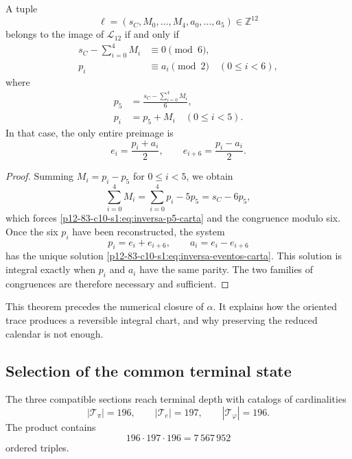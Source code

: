 \begin{theorem}
\label{p12-83-c10-s1:thm:inversion-carta-integral-156}
A tuple
\[
 \ell=(s_C,M_0,\ldots,M_4,a_0,\ldots,a_5)\in\mathbb Z^{12}
\]
belongs to the image of \(\mathcal L_{12}\) if and only if
\begin{align}
 s_C-\sum_{i=0}^{4}M_i&\equiv0\pmod6,
 \label{p12-83-c10-s1:eq:congruencia-seis-carta}\\
 p_i&\equiv a_i\pmod2
 \quad(0\leq i<6),
 \label{p12-83-c10-s1:eq:congruencia-paridad-carta}
\end{align}
where
\begin{align}
 p_5&=\frac{s_C-\sum_{i=0}^{4}M_i}{6},
 \label{p12-83-c10-s1:eq:inversa-p5-carta}\\
 p_i&=p_5+M_i\quad(0\leq i<5).
 \label{p12-83-c10-s1:eq:inversa-pi-carta}
\end{align}
In that case, the only entire preimage is
\begin{equation}
 e_i=\frac{p_i+a_i}{2},
 \qquad
 e_{i+6}=\frac{p_i-a_i}{2}.
 \label{p12-83-c10-s1:eq:inversa-eventos-carta}
\end{equation}
\end{theorem}

\begin{proof}
Summing \(M_i=p_i-p_5\) for \(0\leq i<5\), we obtain
\[
 \sum_{i=0}^{4}M_i
 =\sum_{i=0}^{4}p_i-5p_5
 =s_C-6p_5,
\]
which forces \eqref{p12-83-c10-s1:eq:inversa-p5-carta} and the congruence modulo six.
Once the six \(p_i\) have been reconstructed, the system
\[
 p_i=e_i+e_{i+6},
 \qquad a_i=e_i-e_{i+6}
\]
has the unique solution \eqref{p12-83-c10-s1:eq:inversa-eventos-carta}. This solution is
integral exactly when \(p_i\) and \(a_i\) have the same parity.
The two families of congruences are therefore necessary and sufficient.
\end{proof}

This theorem precedes the numerical closure of \(\alpha\). It explains how the
oriented trace produces a reversible integral chart, and why preserving
the reduced calendar is not enough.

\subsection{Selection of the common terminal state}

The three compatible sections reach terminal depth with catalogs
of cardinalities
\[
 |\mathcal T_\pi|=196,
 \qquad
 |\mathcal T_e|=197,
 \qquad
 |\mathcal T_\varphi|=196.
\]
The product contains
\begin{equation}
 196\cdot197\cdot196=7\,567\,952
 \label{p12-83-c10-s1:eq:cardinal-producto-terminal}
\end{equation}
ordered triples.

